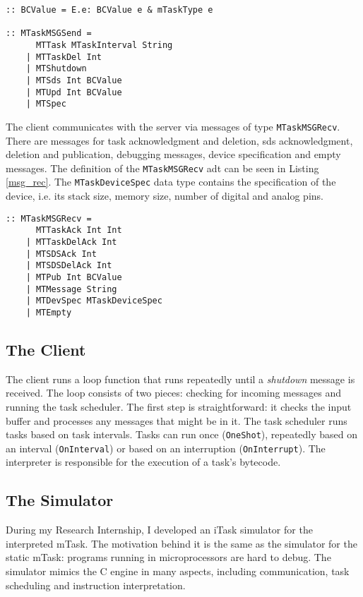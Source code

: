 \begin{lstlisting}[caption=Communication protocol: sent messages,captionpos=b,label=msg_send]
:: BCValue = E.e: BCValue e & mTaskType e

:: MTaskMSGSend = 
      MTTask MTaskInterval String
    | MTTaskDel Int
    | MTShutdown
    | MTSds Int BCValue
    | MTUpd Int BCValue
    | MTSpec
\end{lstlisting}

The client communicates with the server via messages of type \texttt{MTaskMSGRecv}. There are messages for task acknowledgment and deletion, \ac{sds} acknowledgment, deletion and publication, debugging messages, device specification and empty messages. The definition of the \texttt{MTaskMSGRecv} \ac{adt} can be seen in Listing \ref{msg_rec}. The \texttt{MTaskDeviceSpec} data type contains the specification of the device, i.e. its stack size, memory size, number of digital and analog pins.

\begin{lstlisting}[caption=Communication protocol: received messages,captionpos=b,label=msg_rec]
:: MTaskMSGRecv = 
      MTTaskAck Int Int
    | MTTaskDelAck Int
    | MTSDSAck Int
    | MTSDSDelAck Int
    | MTPub Int BCValue
    | MTMessage String
    | MTDevSpec MTaskDeviceSpec
    | MTEmpty
\end{lstlisting}

\subsection{The Client}

The client runs a loop function that runs repeatedly until a \textit{shutdown} message is received. The loop consists of two pieces: checking for incoming messages and running the task scheduler. The first step is straightforward: it checks the input buffer and processes any messages that might be in it. The task scheduler runs tasks based on task intervals. Tasks can run once (\texttt{OneShot}), repeatedly based on an interval (\texttt{OnInterval}) or based on an interruption (\texttt{OnInterrupt}). The interpreter is responsible for the execution of a task's bytecode.

\subsection{The Simulator}\label{mtask_simulator}

During my Research Internship, I developed an iTask simulator for the interpreted \gls{mTask}. The motivation behind it is the same as the simulator for the static \gls{mTask}: programs running in microprocessors are hard to debug. The simulator mimics the C engine in many aspects, including communication, task scheduling and instruction interpretation. 

